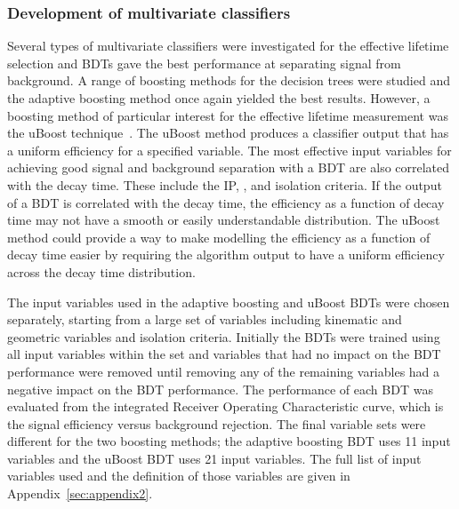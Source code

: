\subsubsection{Development of \el multivariate classifiers}
\label{sec:dev_BDTs}
Several types of multivariate classifiers were investigated for the effective lifetime selection and BDTs gave the best performance at separating signal from background. A range of boosting methods for the decision trees were studied and the adaptive boosting method once again yielded the best results. %
However, a boosting method of particular interest for the effective lifetime measurement was the uBoost technique~\cite{Stevens:2013dya}. The uBoost method produces a classifier output that has a uniform efficiency for a specified variable. The most effective input variables for achieving good signal and background separation with a BDT are also correlated with the decay time. These include the \bs IP, \chiIP, \chiFD and isolation criteria. %
If the output of a BDT is correlated with the \bs decay time, the efficiency as a function of decay time may not have a smooth or easily understandable distribution. The uBoost method could provide a way to make modelling the efficiency as a function of decay time easier by requiring the algorithm output to have a uniform efficiency across the decay time distribution.



The input variables used in the adaptive boosting and uBoost BDTs were chosen separately, starting from a large set of variables including kinematic and geometric variables and isolation criteria. Initially the BDTs were trained using all input variables within the set and variables that had no impact on the BDT performance were removed until removing any of the remaining variables had a negative impact on the BDT performance. The performance of each BDT was evaluated from the integrated Receiver Operating Characteristic curve, which is the signal efficiency versus background rejection. The final variable sets were different for the two boosting methods; the adaptive boosting BDT uses 11 input variables and the uBoost BDT uses 21 input variables. The full list of input variables used and the definition of those variables are given in Appendix~\ref{sec:appendix2}. 


